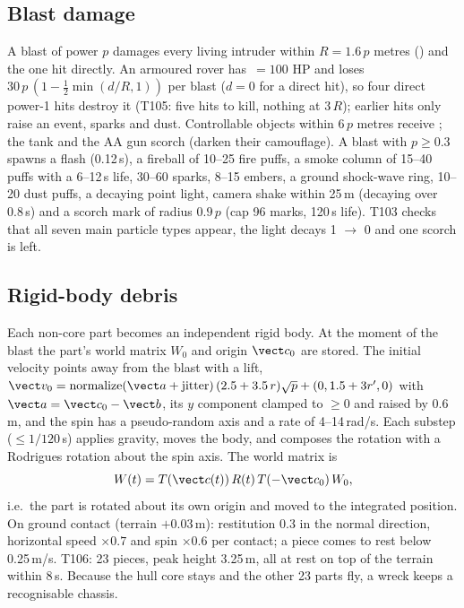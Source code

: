 \subsection{Blast damage}
A blast of power $p$ damages every living intruder within $R=1.6\,p$ metres () and the one hit directly. An armoured rover has
\,$=100$ HP and loses $30\,p\,(1-\tfrac12\min(d/R,1))$ per blast ($d=0$ for a direct hit), so four direct power-1 hits destroy it (T105: five hits to kill, nothing at $3\,R$);
earlier hits only raise an  event, sparks and dust. Controllable objects within $6\,p$ metres receive ; the tank and the AA gun scorch (darken their camouflage). A blast with $p\ge0.3$
spawns a flash (0.12\,s), a fireball of 10--25 fire puffs, a smoke column of 15--40 puffs with a 6--12\,s life, 30--60 sparks, 8--15 embers, a ground shock-wave ring, 10--20 dust
puffs, a decaying point light, camera shake within 25\,m (decaying over 0.8\,s) and a scorch mark of radius $0.9\,p$ (cap 96 marks, 120\,s life). T103 checks that all seven main
particle types appear, the light decays 1 $\to$ 0 and one scorch is left.

\subsection{Rigid-body debris}
Each non-core part becomes an independent rigid body. At the moment of the blast the part's world matrix $W_0$ and origin $\vect c_0$ are stored. The initial velocity points
away from the blast with a lift,
$\vect v_0=\mathrm{normalize}(\vect a+\text{jitter})\,(2.5+3.5\,r)\sqrt p+(0,1.5+3r',0)$ with $\vect a=\vect c_0-\vect b$, its $y$ component clamped to $\ge0$ and raised by 0.6\,m, and the spin has a pseudo-random axis and a rate of
4--14\,rad/s. Each substep ($\le1/120$\,s) applies gravity, moves the body, and composes the rotation with a Rodrigues rotation about the spin axis. The world matrix is
\begin{equation}
  W(t)=T(\vect c(t))\,R(t)\,T(-\vect c_0)\,W_0 ,
\end{equation}
i.e.\ the part is rotated about its own origin and moved to the integrated position. On ground contact (terrain $+0.03$\,m): restitution 0.3 in the normal direction,
horizontal speed $\times0.7$ and spin $\times0.6$ per contact; a piece comes to rest below 0.25\,m/s. T106: 23 pieces, peak height 3.25\,m, all at rest on top of the terrain within
8\,s. Because the hull core stays and the other 23 parts fly, a wreck keeps a recognisable chassis.


